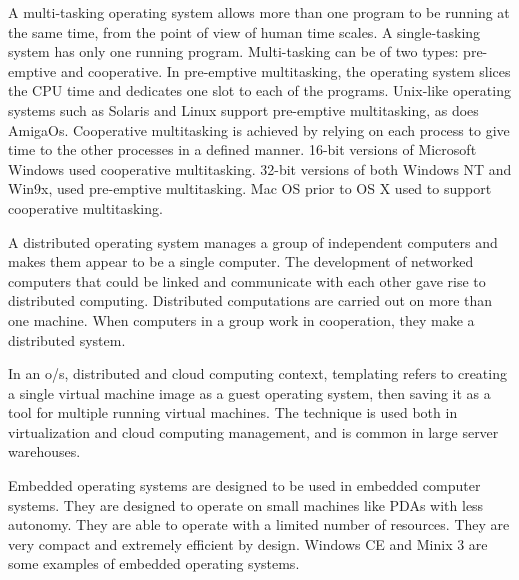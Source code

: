 \documentclass{full}
\begin{document}
A multi-tasking operating system allows more than one program to be running at
the same time, from the point of view of human time scales. A single-tasking
system has only one running program. Multi-tasking can be of two types:
pre-emptive and cooperative. In pre-emptive multitasking, the operating system
slices the CPU time and dedicates one slot to each of the programs. Unix-like
operating systems such as Solaris and Linux support pre-emptive multitasking, as
does AmigaOs. Cooperative multitasking is achieved by relying on each process to
give time to the other processes in a defined manner. 16-bit versions of
Microsoft Windows used cooperative multitasking. 32-bit versions of both Windows
NT and Win9x, used pre-emptive multitasking. Mac OS prior to OS X used to
support cooperative multitasking.

A distributed operating system manages a group of independent computers and
makes them appear to be a single computer. The development of networked
computers that could be linked and communicate with each other gave rise to
distributed computing. Distributed computations are carried out on more than one
machine. When computers in a group work in cooperation, they make a distributed
system.

In an o/s, distributed and cloud computing context, templating refers to
creating a single virtual machine image as a guest operating system, then saving
it as a tool for multiple running virtual machines. The technique is used both
in virtualization and cloud computing management, and is common in large server
warehouses.

Embedded operating systems are designed to be used in embedded computer systems.
They are designed to operate on small machines like PDAs with less autonomy.
They are able to operate with a limited number of resources. They are very
compact and extremely efficient by design. Windows CE and Minix 3 are some
examples of embedded operating systems.
\end{document}

